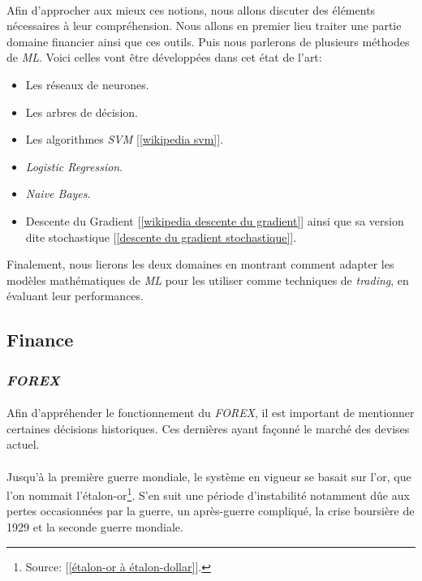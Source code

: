 \documentclass[a4paper, 11pt]{article}
\begin{document}
\paragraph{}Afin d'approcher aux mieux ces notions, nous allons discuter des éléments nécessaires à leur compréhension.
Nous allons en premier lieu traiter une partie domaine financier ainsi que ces outils. Puis nous parlerons de plusieurs méthodes de \textit{ML}.
Voici celles vont être développées dans cet état de l'art:
\begin{itemize}
\item Les réseaux de neurones.
\item Les arbres de décision.
\item Les algorithmes \textit{SVM} [\ref{wikipedia svm}].
\item \textit{Logistic Regression}.
\item \textit{Naive Bayes}.
\item Descente du Gradient [\ref{wikipedia descente du gradient}] ainsi que sa version dite stochastique [\ref{descente du gradient stochastique}].
\end{itemize}

Finalement, nous lierons les deux domaines en montrant comment adapter les modèles mathématiques de \textit{ML} pour les utiliser comme techniques de \textit{trading}, en évaluant leur performances.


\subsection{Finance}

\subsubsection{\textit{FOREX}}

\paragraph{}Afin d'appréhender le fonctionnement du \textit{FOREX}, il est important de mentionner certaines décisions historiques. Ces dernières ayant façonné le marché des devises actuel.

\paragraph{}
Jusqu'à la première guerre mondiale, le système en vigueur se basait sur l'or, que l'on nommait l'étalon-or\footnote{Source: [\ref{étalon-or à étalon-dollar}].}. S'en suit une période d'instabilité notamment dûe aux pertes occasionnées par la guerre, un après-guerre compliqué, la crise boursière de 1929 et la seconde guerre mondiale.
\end{document}
